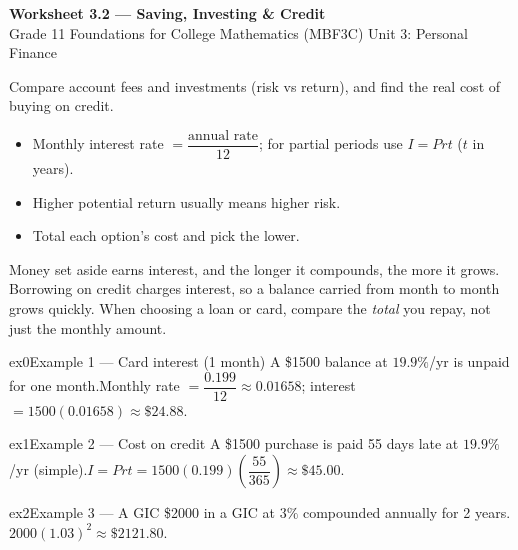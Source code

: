 \documentclass[11pt]{article}
\begin{document}
\begin{center}
{\LARGE\bfseries\color{titleblue}Worksheet 3.2 --- Saving, Investing \& Credit}\\[2pt]
{\small Grade 11 Foundations for College Mathematics (MBF3C) \textperiodcentered{} Unit 3: Personal Finance}
\end{center}

\begin{ideabox}
Compare account fees and investments (risk vs return), and find the real cost of buying on credit.
\begin{itemize}[leftmargin=*,itemsep=2pt]
  \item Monthly interest rate $=\dfrac{\text{annual rate}}{12}$; for partial periods use $I=Prt$ ($t$ in years).
  \item Higher potential return usually means higher risk.
  \item Total each option's cost and pick the lower.
\end{itemize}
\end{ideabox}

\begin{learnbox}
Money set aside earns interest, and the longer it compounds, the more it grows.
Borrowing on credit charges interest, so a balance carried from month to month grows quickly.
When choosing a loan or card, compare the \emph{total} you repay, not just the monthly amount.
\end{learnbox}


\begin{example}{ex0}{Example 1 --- Card interest (1 month)}
A \$1500 balance at $19.9\%$/yr is unpaid for one month.\soln Monthly rate $=\dfrac{0.199}{12}\approx0.01658$; interest $=1500(0.01658)\approx\$24.88$.
\end{example}

\begin{example}{ex1}{Example 2 --- Cost on credit}
A \$1500 purchase is paid 55 days late at $19.9\%$/yr (simple).\soln $I=Prt=1500(0.199)\left(\dfrac{55}{365}\right)\approx\$45.00$.
\end{example}

\begin{example}{ex2}{Example 3 --- A GIC}
\$2000 in a GIC at $3\%$ compounded annually for 2 years.\soln $2000(1.03)^2\approx\$2121.80$.
\end{example}
\end{document}
